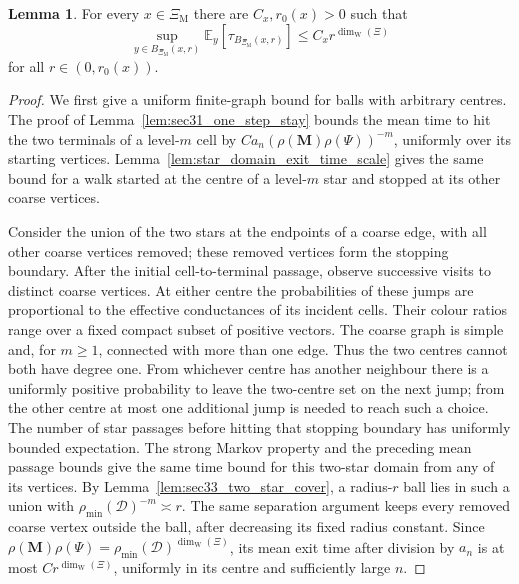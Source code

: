 \documentclass{article}
\theoremstyle{plain}
\theoremstyle{definition}
\newtheorem{lemma}[theorem]{Lemma}
\newcommand{\dimwalk}{\dim_\mathrm{W}}
\begin{document}
\begin{lemma}\label{lem:heat-exit}
For every $x\in \Xi_{\mathrm M}$ there are $C_x,r_0(x)>0$ such that
\[
\sup_{y\in B_{\Xi_{\mathrm M}}(x,r)}
\mathbb E_y[\tau_{B_{\Xi_{\mathrm M}}(x,r)}]
\le
C_x r^{\dimwalk(\Xi)}
\]
for all $r\in(0,r_0(x))$.
\end{lemma}

\begingroup\color{red}
\begin{proof}
We first give a uniform finite-graph bound for balls with arbitrary
centres. The proof of Lemma~\ref{lem:sec31_one_step_stay} bounds the
mean time to hit the two terminals of a level-$m$ cell by
$C a_n(\rho(\mathbf M)\rho(\Psi))^{-m}$, uniformly over its
starting vertices. Lemma~\ref{lem:star_domain_exit_time_scale} gives
the same bound for a walk started at the centre of a level-$m$ star
and stopped at its other coarse vertices.

Consider the union of the two stars at the endpoints of a coarse edge,
with all other coarse vertices removed; these removed vertices form
the stopping boundary.
After the initial cell-to-terminal passage, observe successive visits
to distinct coarse vertices. At either centre the probabilities of
these jumps are proportional to the effective conductances of its
incident cells. Their colour ratios range over a fixed compact subset
of positive vectors. The coarse graph is simple and, for $m\ge1$,
connected with more than one edge. Thus the two centres cannot both
have degree one. From whichever centre has another neighbour there
is a uniformly positive probability to leave the two-centre set on
the next jump; from the other centre at most one additional jump is
needed to reach such a choice. The number of star passages before
hitting that stopping boundary has uniformly bounded expectation.
The strong Markov property and the preceding mean passage bounds give
the same time bound for this two-star domain from any of its vertices.
By Lemma~\ref{lem:sec33_two_star_cover}, a radius-$r$ ball lies in
such a union with $\rho_{\min}(\mathcal D)^{-m}\asymp r$.
The same separation argument keeps every removed coarse vertex outside
the ball, after decreasing its fixed radius constant.
Since $\rho(\mathbf M)\rho(\Psi)=\rho_{\min}(\mathcal D)^{\dimwalk(\Xi)}$,
its mean exit time after division by $a_n$ is at most
$Cr^{\dimwalk(\Xi)}$, uniformly in its centre and sufficiently large $n$.


\end{proof}
\end{document}
